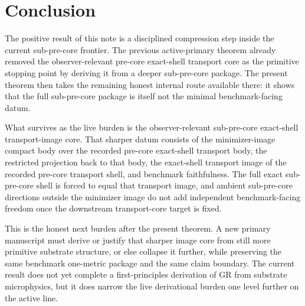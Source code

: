 \documentclass[11pt]{article}
\begin{document}
\section{Conclusion}

The positive result of this note is a disciplined compression step inside the current sub-pre-core frontier. The previous active-primary theorem already removed the observer-relevant pre-core exact-shell transport core as the primitive stopping point by deriving it from a deeper sub-pre-core package. The present theorem then takes the remaining honest internal route available there: it shows that the full sub-pre-core package is itself not the minimal benchmark-facing datum.

What survives as the live burden is the observer-relevant sub-pre-core exact-shell transport-image core. That sharper datum consists of the minimizer-image compact body over the recorded pre-core exact-shell transport body, the restricted projection back to that body, the exact-shell transport image of the recorded pre-core transport shell, and benchmark faithfulness. The full exact sub-pre-core shell is forced to equal that transport image, and ambient sub-pre-core directions outside the minimizer image do not add independent benchmark-facing freedom once the downstream transport-core target is fixed.

This is the honest next burden after the present theorem. A new primary manuscript must derive or justify that sharper image core from still more primitive substrate structure, or else collapse it further, while preserving the same benchmark one-metric package and the same claim boundary. The current result does not yet complete a first-principles derivation of GR from substrate microphysics, but it does narrow the live derivational burden one level further on the active line.
\end{document}
